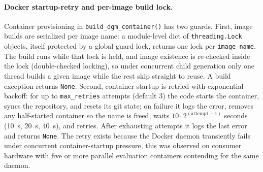 \enlargethispage{3\baselineskip}
\paragraph{Docker startup-retry and per-image build lock.}
Container provisioning in \texttt{build\_dgm\_container()} has two guards.
First, image builds are serialized per image name: a module-level dict of
\texttt{threading.Lock} objects, itself protected by a global guard lock,
returns one lock per \texttt{image\_name}. The build runs while that lock
is held, and image existence is re-checked inside the lock (double-checked
locking), so under concurrent child generation only one thread builds a
given image while the rest skip straight to reuse. A build exception
returns \texttt{None}. Second, container startup is retried with
exponential backoff: for up to \texttt{max\_retries} attempts (default 3)
the code starts the container, syncs the repository, and resets its git
state; on failure it logs the error, removes any half-started container so
the name is freed, waits $10 \cdot 2^{(\text{attempt}-1)}$ seconds (10~s,
20~s, 40~s), and retries. After exhausting attempts it logs the last
error and returns \texttt{None}. The retry exists because the Docker
daemon transiently fails under concurrent container-startup pressure, this
was observed on consumer hardware with five or more parallel evaluation
containers contending for the same daemon.
